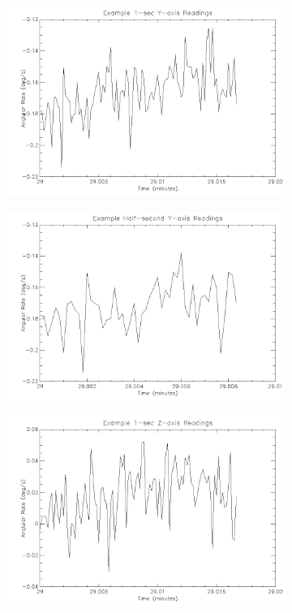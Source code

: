 {\begin{figure}[htbp]
\begin{subfigure}{0.45\textwidth}
		\includegraphics[width=1\linewidth]{appendix/img/campaign_results/gyroy1sec.png}
		\caption{}
		\label{fig:sub:gyroy1}
	\end{subfigure}
	\begin{subfigure}{0.45\textwidth}
		\includegraphics[width=1\linewidth]{appendix/img/campaign_results/gyroyhalfsec.png}
		\caption{}
		\label{fig:sub:gyroyh}
	\end{subfigure}
	\begin{subfigure}{0.45\textwidth}
		\includegraphics[width=1\linewidth]{appendix/img/campaign_results/gyroz1sec.png}

\end{subfigure}
\end{figure}}
